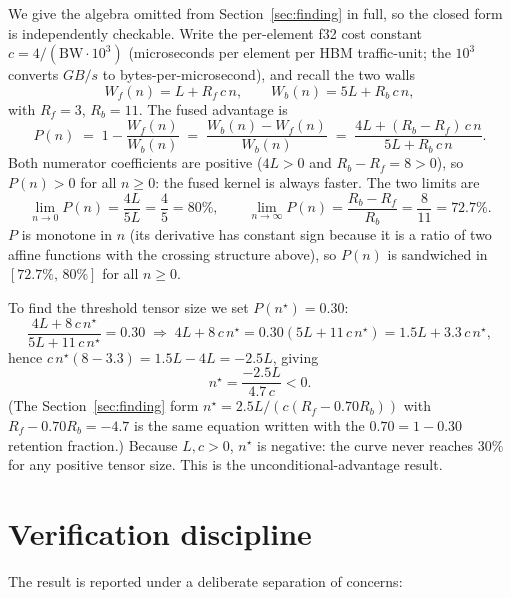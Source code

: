\documentclass[11pt,a4paper]{article}
\begin{document}
We give the algebra omitted from Section~\ref{sec:finding} in full, so the
closed form is independently checkable. Write the per-element f32 cost constant
$c = 4/(\mathrm{BW}\cdot 10^3)$ (microseconds per element per HBM traffic-unit;
the $10^3$ converts $\si{GB/s}$ to bytes-per-microsecond), and recall the two
walls
\[
  W_f(n) = L + R_f\,c\,n, \qquad W_b(n) = 5L + R_b\,c\,n,
\]
with $R_f = 3$, $R_b = 11$. The fused advantage is
\[
  P(n) \;=\; 1 - \frac{W_f(n)}{W_b(n)}
       \;=\; \frac{W_b(n) - W_f(n)}{W_b(n)}
       \;=\; \frac{4L + (R_b - R_f)\,c\,n}{5L + R_b\,c\,n}.
\]
Both numerator coefficients are positive ($4L>0$ and $R_b - R_f = 8 > 0$), so
$P(n) > 0$ for all $n \ge 0$: the fused kernel is always faster. The two limits
are
\[
  \lim_{n\to 0} P(n) = \frac{4L}{5L} = \frac{4}{5} = 80\%,
  \qquad
  \lim_{n\to\infty} P(n) = \frac{R_b - R_f}{R_b} = \frac{8}{11} = 72.7\%.
\]
$P$ is monotone in $n$ (its derivative has constant sign because it is a
ratio of two affine functions with the crossing structure above), so $P(n)$ is
sandwiched in $[72.7\%,\,80\%]$ for all $n \ge 0$.

To find the threshold tensor size we set $P(n^\star) = 0.30$:
\[
  \frac{4L + 8\,c\,n^\star}{5L + 11\,c\,n^\star} = 0.30
  \;\Longrightarrow\;
  4L + 8\,c\,n^\star = 0.30(5L + 11\,c\,n^\star)
  = 1.5L + 3.3\,c\,n^\star,
\]
hence $c\,n^\star(8 - 3.3) = 1.5L - 4L = -2.5L$, giving
\[
  n^\star = \frac{-2.5L}{4.7\,c} < 0.
\]
(The Section~\ref{sec:finding} form $n^\star = 2.5L/(c(R_f - 0.70R_b))$ with
$R_f - 0.70R_b = -4.7$ is the same equation written with the
$0.70 = 1 - 0.30$ retention fraction.) Because $L,c>0$, $n^\star$ is negative:
the curve never reaches $30\%$ for any positive tensor size. This is the
unconditional-advantage result.

\section{Verification discipline}
\label{app:discipline}

The result is reported under a deliberate separation of concerns:
\end{document}
